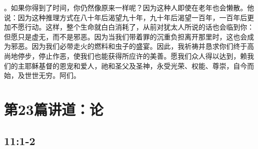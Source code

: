 。如果你得到了时间，你仍然像原来一样呢？因为这种人即使在老年也会懒散。他说：因为这种推理方式在八十年后渴望九十年，九十年后渴望一百年，一百年后更加不愿行动。这样，整个生命就白白消耗了，从前对犹太人所说的话也会临到你： 但愿只是虚无，而不是邪恶。因为当我们带着罪的沉重负担离开那里时，这也会成为邪恶。因为我们必带走火的燃料和虫子的盛宴。因此，我祈祷并恳求你们终于高尚地停步，停止作恶，使我们也能获得所应许的美善。愿我们众人得以达到，赖我们的主耶稣基督的恩宠和爱人，祂和圣父及圣神，永受光荣、权能、尊崇，自今而始，及世世无穷。阿们。\par



\section{第23篇讲道：论}


\subsection{ 11:1-2}

\par

